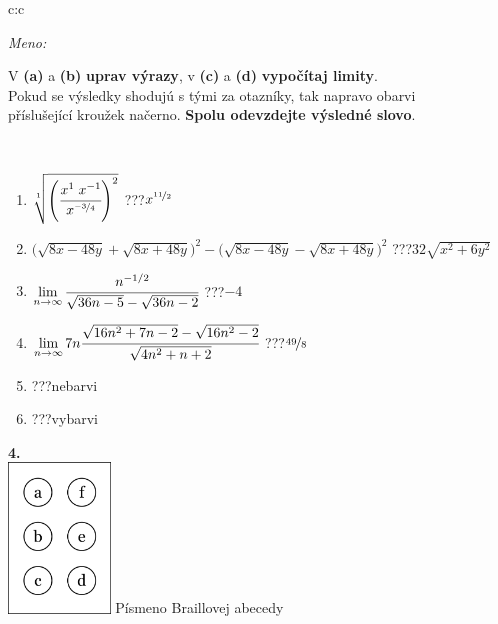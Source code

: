 \documentclass[10pt]{report}
\begin{document}
\begin{tabular}{c:c}
\begin{minipage}[c][104.5mm][t]{0.5\linewidth}
\begin{center}
\textit{Meno:}\phantom{xxxxxxxxxxxxxxxxxxxxxxxxxxxxxxxxxxxxxxxxxxxxxxxxxxxxxxxxxxxxxxxxx}\\[5mm]
\begin{minipage}{0.95\linewidth}
\begin{center}
V \textbf{(a)} a \textbf{(b)} \textbf{uprav výrazy}, v \textbf{(c)} a \textbf{(d)} \textbf{vypočítaj limity}.\\Pokud se výsledky shodujú s tými za otazníky, tak napravo obarvi\\příslušející kroužek načerno. \textbf{Spolu odevzdejte výsledné slovo}.
\end{center}
\end{minipage}
\\[1mm]
\begin{minipage}{0.79\linewidth}
\begin{center}
\begin{varwidth}{\linewidth}
\begin{enumerate}
\small
\item $\sqrt[1]{\left(\cfrac{x^{1}\;x^{-1}}{x^{\nicefrac{-3}{4}}}\right)^{2}}$\quad \dotfill\; ???\;\dotfill \quad $x^{\nicefrac{11}{2}}$
\item {\footnotesize{\scriptsize$\big(\sqrt{8x-48y}+\sqrt{8x+48y}\big)^2-\big(\sqrt{8x-48y}-\sqrt{8x+48y}\big)^2$}\quad \dotfill\; ???\;\dotfill \quad $32\sqrt{x^2+6y^2}$}
\item $\lim\limits_{n\to\infty}\cfrac{n^{-1/2}}{\sqrt{36n-5}-\sqrt{36n-2}}$\quad \dotfill\; ???\;\dotfill \quad $-4$
\item $\lim\limits_{n\to\infty}7n\cfrac{\sqrt{16n^2+7n-2}-\sqrt{16n^2-2}}{\sqrt{4n^2+n+2}}$\quad \dotfill\; ???\;\dotfill \quad $\nicefrac{49}{8}$
\item \quad \dotfill\; ???\;\dotfill \quad nebarvi
\item \quad \dotfill\; ???\;\dotfill \quad vybarvi
\end{enumerate}
\end{varwidth}
\end{center}
\end{minipage}
\begin{minipage}{0.20\linewidth}
\begin{center}
{\Huge\bfseries 4.} \\[2mm]
\includegraphics[height=40mm]{../images/braille.png}
{\small Písmeno Braillovej abecedy}
\end{center}
\end{minipage}
\end{center}
\end{minipage}
%
\end{tabular}
\end{document}
